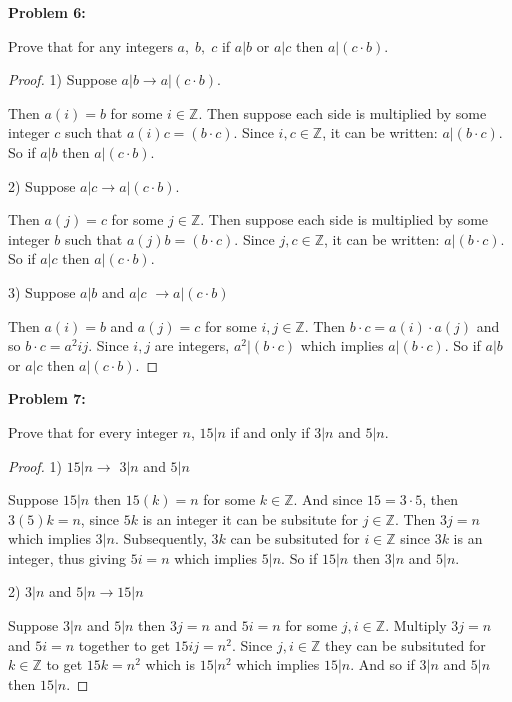 \documentclass{article}
\begin{document}

    \textbf{Problem 6:}

    Prove that for any integers $a,\; b,\; c$ if $a|b$ or $a|c$ then $a|(c \cdot b)$.

    \begin{proof}
        1) Suppose $a|b \rightarrow a|(c\cdot b)$.

        Then $a(i) = b$ for some $i \in\mathbb{Z}$. Then suppose each side is multiplied by 
        some integer $c$ such that $a(i)c = (b\cdot c)$. Since $i,c \in\mathbb{Z}$,
        it can be written: $a|(b\cdot c)$. So if $a|b$ then 
        $a|(c \cdot b)$.

        2) Suppose $a|c \rightarrow a|(c\cdot b)$.

        Then $a(j) = c$ for some $j \in\mathbb{Z}$. Then suppose each side is multiplied by 
        some integer $b$ such that $a(j)b = (b\cdot c)$. Since $j,c \in\mathbb{Z}$,
        it can be written: $a|(b\cdot c)$. So if $a|c$ then 
        $a|(c \cdot b)$.

        3) Suppose $a|b$ and $a|c$ $\rightarrow a|(c\cdot b)$
        
        Then $a(i) = b$ and $a(j)=c$ for some $i,j \in\mathbb{Z}$.
        Then $b\cdot c=a(i)\cdot a(j)$ and so $b\cdot c=a^2ij$. Since $i,j$ are integers,
        $a^2|(b\cdot c)$ which implies $a|(b\cdot c)$. So if $a|b$ or $a|c$ then 
        $a|(c \cdot b)$.
    \end{proof}


    \textbf{Problem 7:}

    Prove that for every integer $n$, $15|n$ if and only if $3|n$ and $5|n$.

    \begin{proof}
        1) $15|n \rightarrow$ $3|n$ and $5|n$

        Suppose $15|n$ then $15(k) = n$ for some $k\in\mathbb{Z}$. And since $15 = 3\cdot 5$,
        then $3(5)k=n$, since $5k$ is an integer it can be subsitute for $j\in\mathbb{Z}$.
        Then $3j=n$ which implies $3|n$. Subsequently, $3k$ can be subsituted for
        $i\in\mathbb{Z}$ since $3k$ is an integer, thus giving $5i=n$ which implies $5|n$.
        So if $15|n$ then $3|n$ and $5|n$.

        2) $3|n$ and $5|n \rightarrow 15|n$

        Suppose $3|n$ and $5|n$ then $3j=n$ and $5i=n$ for some $j,i\in\mathbb{Z}$. 
        Multiply $3j=n$ and $5i=n$ together to get $15ij=n^2$. 
        Since $j,i\in\mathbb{Z}$ they can be subsituted for $k\in\mathbb{Z}$ to get
        $15k=n^2$ which is $15|n^2$ which implies $15|n$. And so if $3|n$ and $5|n$
        then $15|n$.
    \end{proof}
\end{document}
